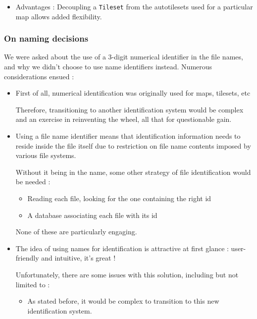 \documentclass[11pt]{article}
\begin{document}
{\begin{itemize}
	Note : for autotiles, all values in \verb|passages| and \verb|terrain_tags|, therefore these fields were simplified to a \textit{single integer value}.
	
	Note : RPG Maker XP seem to fail to load tilesets/autotiles after an extraction with destination "\verb|Graphics\Tilesets|" and "\verb|Graphics\Autotiles|" directories, probably because there are foreign files in the graphic folder. For that reason, other directories were used.
	
	\item Advantages : Decoupling a \verb|Tileset| from the autotilesets used for a particular map allows added flexibility.
\end{itemize}

\newpage
\subsubsection{On naming decisions}

We were asked about the use of a 3-digit numerical identifier in the file names, and why we didn't choose to use name identifiers instead. Numerous considerations ensued :
\begin{itemize}
	\item First of all, numerical identification was originally used for maps, tilesets, etc
	
	Therefore, transitioning to another identification system would be complex and an exercise in reinventing the wheel, all that for questionable gain.
	
	\item Using a file name identifier means that identification information needs to reside inside the file itself due to restriction on file name contents imposed by various file systems.
	
	Without it being in the name, some other strategy of file identification would be needed :
	\begin{itemize}
		\item Reading each file, looking for the one containing the right id
		\item A database associating each file with its id
	\end{itemize}
	None of these are particularly engaging.
	
	\item The idea of using names for identification is attractive at first glance : user-friendly and intuitive, it's great !
	
	Unfortunately, there are some issues with this solution, including but not limited to :
	\begin{itemize}
		\item As stated before, it would be complex to transition to this new identification system.
		

\end{itemize}
\end{itemize}}
\end{document}
